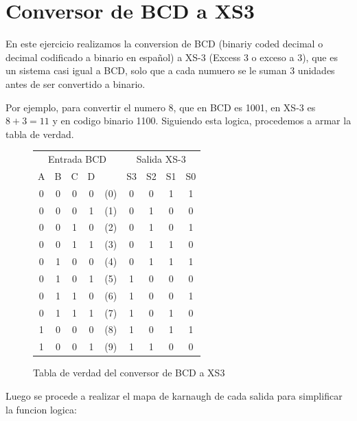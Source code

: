 \documentclass[]{informeutn}
\begin{document}
  \maketitle

  \tableofcontents
  \setcounter{page}{1}
  \thispagestyle{plain}


  \chapter{Conversor de BCD a XS3}
    En este ejercicio realizamos la conversion de BCD (binariy coded decimal o decimal codificado a binario en español)
    a XS-3 (Excess 3 o exceso a 3), que es un sistema casi igual a BCD, solo que a cada numuero se le suman 3 unidades
    antes de ser convertido a binario.

    Por ejemplo, para convertir el numero 8, que en BCD es 1001, en XS-3 es $8+3=11$ y en codigo binario 1100. 
    Siguiendo esta logica, procedemos a armar la tabla de verdad.
    \begin{figure}[!ht]
      \centering
      \begin{tabular}{|c|c|c|c|c||c|c|c|c|}
      \hline
      \multicolumn{5}{|c||}{Entrada BCD} & \multicolumn{4}{c|}{Salida XS-3} \\
      A & B & C & D & & S3 & S2 & S1 & S0 \\
      \hline
      0 & 0 & 0 & 0 & (0) & 0 & 0 & 1 & 1 \\
      0 & 0 & 0 & 1 & (1) & 0 & 1 & 0 & 0 \\
      0 & 0 & 1 & 0 & (2) & 0 & 1 & 0 & 1 \\
      0 & 0 & 1 & 1 & (3) & 0 & 1 & 1 & 0 \\
      0 & 1 & 0 & 0 & (4) & 0 & 1 & 1 & 1 \\
      0 & 1 & 0 & 1 & (5) & 1 & 0 & 0 & 0 \\
      0 & 1 & 1 & 0 & (6) & 1 & 0 & 0 & 1 \\
      0 & 1 & 1 & 1 & (7) & 1 & 0 & 1 & 0 \\
      1 & 0 & 0 & 0 & (8) & 1 & 0 & 1 & 1 \\
      1 & 0 & 0 & 1 & (9) & 1 & 1 & 0 & 0 \\
      \hline
      \end{tabular}
      \caption{Tabla de verdad del conversor de BCD a XS3}
    \end{figure}

    Luego se procede a realizar el mapa de karnaugh de cada salida para simplificar la funcion logica:
\end{document}
